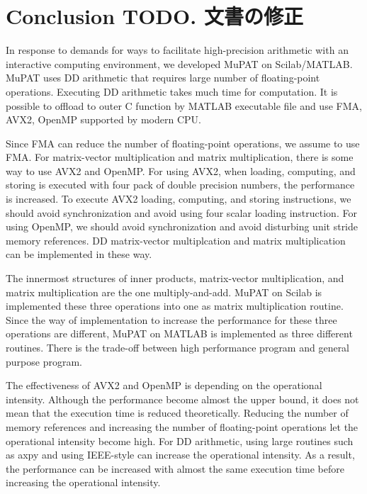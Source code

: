 \documentclass{IOS-Book-Article}
\begin{document}
\section{Conclusion TODO. 文書の修正}
In response to demands for ways to facilitate high-precision arithmetic with an interactive computing environment, we developed MuPAT on Scilab/MATLAB. MuPAT uses DD arithmetic that requires large number of floating-point operations. Executing DD arithmetic takes much time for computation. It is possible to offload to outer C function by MATLAB executable file and use FMA, AVX2, OpenMP supported by modern CPU. 

Since FMA can reduce the number of floating-point operations, we assume to use FMA.  
For matrix-vector multiplication and matrix multiplication, there is some way to use AVX2 and OpenMP. 
For using AVX2, when loading, computing, and storing is executed with four pack of double precision numbers, the performance is increased. 
To execute AVX2 loading, computing, and storing instructions, we should avoid synchronization and avoid using four scalar loading instruction. 
For using OpenMP, we should avoid synchronization and avoid disturbing unit stride memory references.
DD matrix-vector multiplcation and matrix multiplication can be implemented in these way. 

The innermost structures of inner products, matrix-vector multiplication, and matrix multiplication are the one multiply-and-add. MuPAT on Scilab is implemented these three operations into one as matrix multiplication routine. Since the way of implementation to increase the performance for these three operations are different, MuPAT on MATLAB is implemented as three different routines. There is the trade-off between high performance program and general purpose program.

The effectiveness of AVX2 and OpenMP is depending on the operational intensity. 
Although the performance become almost the upper bound, it does not mean that the execution time is reduced theoretically. Reducing the number of memory references and increasing the number of floating-point operations let the operational intensity become high. For DD arithmetic, using large routines such as axpy and using IEEE-style can increase the operational intensity. As a result, the performance can be increased with almost the same execution time before increasing the operational intensity. 
\end{document}
